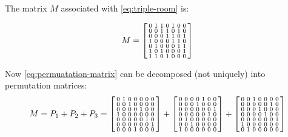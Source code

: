 \begin{example}
The matrix $M$ associated with \eqref{eq:triple-room} is:

\begin{equation}
 M = \begin{bsmallmatrix}
    0 & 1 & 1 & 0 & 1 & 0 & 0 \\
    0 & 0 & 1 & 1 & 0 & 1 & 0 \\
    0 & 0 & 0 & 1 & 1 & 0 & 1 \\
    1 & 0 & 0 & 0 & 1 & 1 & 0 \\
    0 & 1 & 0 & 0 & 0 & 1 & 1 \\
    1 & 0 & 1 & 0 & 0 & 0 & 1 \\
    1 & 1 & 0 & 1 & 0 & 0 & 0 \\
  \end{bsmallmatrix}
  \label{eq:permuatation-matrix}
\end{equation}

Now \eqref{eq:permuatation-matrix} can be decomposed (not uniquely) into permutation matrices:
\begin{equation}
 M = P_1 + P_2 + P_3 = 
  \begin{bsmallmatrix}
    0 & 1 & 0 & 0 & 0 & 0 & 0 \\
    0 & 0 & 1 & 0 & 0 & 0 & 0 \\
    0 & 0 & 0 & 0 & 1 & 0 & 0 \\
    1 & 0 & 0 & 0 & 0 & 0 & 0 \\
    0 & 0 & 0 & 0 & 0 & 1 & 0 \\
    0 & 0 & 0 & 0 & 0 & 0 & 1 \\
    0 & 0 & 0 & 1 & 0 & 0 & 0 \\
  \end{bsmallmatrix}
  +
  \begin{bsmallmatrix}
    0 & 0 & 0 & 0 & 1 & 0 & 0 \\
    0 & 0 & 0 & 1 & 0 & 0 & 0 \\
    0 & 0 & 0 & 0 & 0 & 0 & 1 \\
    0 & 0 & 0 & 0 & 0 & 1 & 0 \\
    0 & 1 & 0 & 0 & 0 & 0 & 0 \\
    0 & 0 & 1 & 0 & 0 & 0 & 0 \\
    1 & 0 & 0 & 0 & 0 & 0 & 0 \\
  \end{bsmallmatrix}
  +
  \begin{bsmallmatrix}
    0 & 0 & 1 & 0 & 0 & 0 & 0 \\
    0 & 0 & 0 & 0 & 0 & 1 & 0 \\
    0 & 0 & 0 & 1 & 0 & 0 & 0 \\
    0 & 0 & 0 & 0 & 1 & 0 & 0 \\
    0 & 0 & 0 & 0 & 0 & 0 & 1 \\
    1 & 0 & 0 & 0 & 0 & 0 & 0 \\
    0 & 1 & 0 & 0 & 0 & 0 & 0 \\
  \end{bsmallmatrix}
\end{equation}


\end{example}
